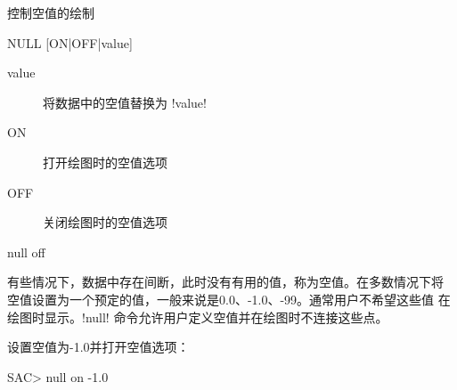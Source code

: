 \label{cmd:null}

控制空值的绘制

\begin{SACSTX}
NULL [ON|OFF|value]
\end{SACSTX}

\begin{description}
\item [value] 将数据中的空值替换为 !value!
\item [ON] 打开绘图时的空值选项
\item [OFF] 关闭绘图时的空值选项
\end{description}

\begin{SACDFT}
null off
\end{SACDFT}

有些情况下，数据中存在间断，此时没有有用的值，称为空值。在多数情况下将
空值设置为一个预定的值，一般来说是0.0、-1.0、-99。通常用户不希望这些值
在绘图时显示。!null! 命令允许用户定义空值并在绘图时不连接这些点。

设置空值为-1.0并打开空值选项：
\begin{SACCode}
SAC> null on -1.0
\end{SACCode}
